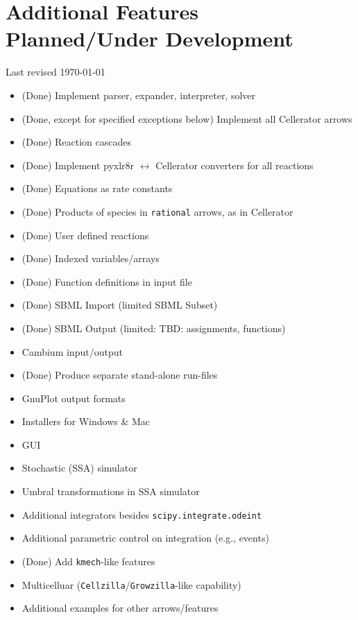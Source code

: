 \chapter[Planned Features]{Additional Features Planned/Under Development}
\label{chapter:future}
Last revised \today
\begin{itemize}
\setlength{\parskip}{0pt}
\setlength{\itemsep}{0pt}
\setlength{\topsep}{0pt}
\item[\checkmark] (Done) Implement parser, expander, interpreter, solver
\item[\checkmark] (Done, except for specified exceptions below) Implement all Cellerator arrows 
\item[\checkmark] (Done)  Reaction cascades
\item[\checkmark] (Done) Implement pyxlr8r $\leftrightarrow$ Cellerator converters for all reactions 
\item[\checkmark] (Done) Equations as rate constants
\item[\checkmark] (Done) Products of species in {\tt rational} arrows, as in Cellerator
\item[\checkmark] (Done) User defined reactions
\item[\checkmark] (Done) Indexed variables/arrays
\item[\checkmark] (Done) Function definitions in input file
\item[\checkmark] (Done) SBML Import (limited SBML Subset)
\item[\checkmark] (Done) SBML Output (limited: TBD: assignments, functions)
\item Cambium input/output
\item[\checkmark] (Done) Produce separate stand-alone run-files
\item GnuPlot output formats
\item Installers for Windows \& Mac
\item GUI
\item Stochastic (SSA) simulator
\item Umbral transformations in SSA simulator
\item Additional integrators besides {\tt scipy.integrate.odeint}
\item Additional parametric control on integration (e.g., events) 
\item[\checkmark] (Done) Add {\tt kmech}-like features
\item Multicelluar ({\tt Cellzilla}/{\tt Growzilla}-like capability)
\item Additional examples for other arrows/features 

\end{itemize}
